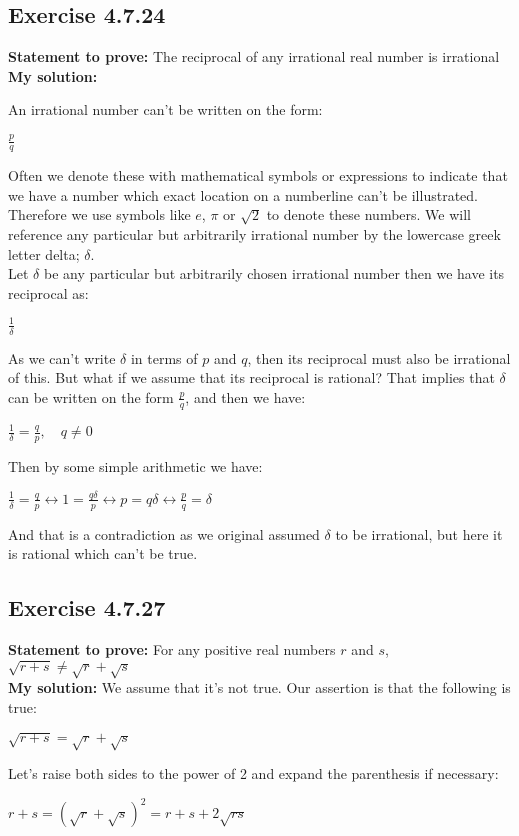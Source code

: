 \documentclass{article}
\newcommand{\cent}[1]{\begin{center}#1\end{center}}
\newcommand{\Prove}{\textbf{Statement to prove: }}
\newcommand{\Solution}{\textbf{My solution: }}
\newcommand{\QED}{\boxed{}}
\newcommand{\Exercise}[1]{\subsection{Exercise #1}}
\begin{document}
	\Exercise{4.7.24}
	
	\Prove
	The reciprocal of any irrational real number is irrational\\
	
	\Solution
	
	An irrational number can't be written on the form:
	
	\cent{$\frac{p}{q}$}
	
	Often we denote these with mathematical symbols or expressions to indicate that we have a number which exact location on a numberline can't be illustrated. Therefore we use symbols like $e$, $\pi$ or $\sqrt{2}$ to denote these numbers. We will reference any particular but arbitrarily irrational number by the lowercase greek letter delta; $\delta$.\\
	
	Let $\delta$ be any particular but arbitrarily chosen irrational number then we have its reciprocal as:
	
	\cent{$\frac{1}{\delta}$}
	
	As we can't write $\delta$ in terms of $p$ and $q$, then its reciprocal must also be irrational of this. But what if we assume that its reciprocal is rational? That implies that $\delta$ can be written on the form $\frac{p}{q}$, and then we have:
	
	\cent{$\frac{1}{\delta} = \frac{q}{p}, \quad q \neq 0$}
	
	Then by some simple arithmetic we have:
	
	\cent{$\frac{1}{\delta} = \frac{q}{p} \leftrightarrow 1=\frac{q\delta}{p} \leftrightarrow p = q \delta  \leftrightarrow \frac{p}{q} = \delta$}
	
	And that is a contradiction as we original assumed $\delta$ to be irrational, but here it is rational which can't be true.\\
	\QED
	
	\Exercise{4.7.27}
	
	\Prove
	For any positive real numbers $r$ and $s$, $\sqrt{r+s} \neq \sqrt{r} + \sqrt{s}$\\
	
	\Solution
	We assume that it's not true. Our assertion is that the following is true:
	
	\cent{$\sqrt{r+s} = \sqrt{r} + \sqrt{s}$}
	
	Let's raise both sides to the power of 2 and expand the parenthesis if necessary:
	
	\cent{$r + s = (\sqrt{r} + \sqrt{s})^{2} = r + s + 2 \sqrt{rs}$}
	
\end{document}
